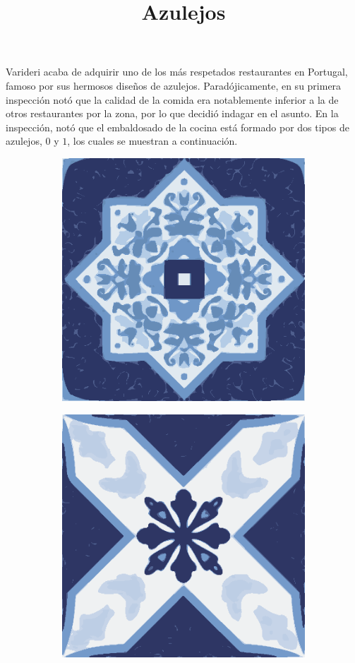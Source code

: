 \documentclass{oci}
\title{Azulejos}
\begin{document}
\begin{problemDescription}
Varideri acaba de adquirir uno de los más respetados restaurantes en Portugal,
famoso por sus hermosos diseños de azulejos.
Paradójicamente, en su primera inspección notó que la calidad de la comida era
notablemente inferior a la de otros restaurantes por la zona, por lo que decidió
indagar en el asunto.
En la inspección, notó que el embaldosado de la cocina está formado por dos
tipos de azulejos, $0$ y $1$, los cuales se muestran a continuación.

\begin{figure}[h]
  \centering
  \begin{subfigure}{0.4\textwidth}
    \centering
    \includegraphics[scale=0.3]{a.eps}
  \end{subfigure}
  \begin{subfigure}{0.4\textwidth}
    \centering
    \includegraphics[scale=0.3]{b.eps}
  \end{subfigure}
\end{figure}


\end{problemDescription}
\end{document}
